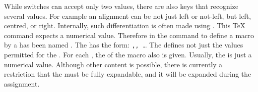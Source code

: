 \begin{Declaration}
\end{Declaration}
While switches can accept only two values, there are also keys that recognize
several values. For example an alignment can be not just left or not-left, but
left, centred, or right. Internally, such differentiation is often made using
. This \TeX{} command expects a numerical value. Therefore in
 the command to define a macro by a  has been
named . The  has the form:
  \texttt{,}\linebreak[1]%
  \texttt{,}~\dots
The  defines not just the values permitted for the
. For each , the  of the macro
 also is given. Usually, the  is just
a numerical value. Although other content is possible, there is currently a
restriction that the  must be fully expandable, and it will
be expanded during the assignment.
